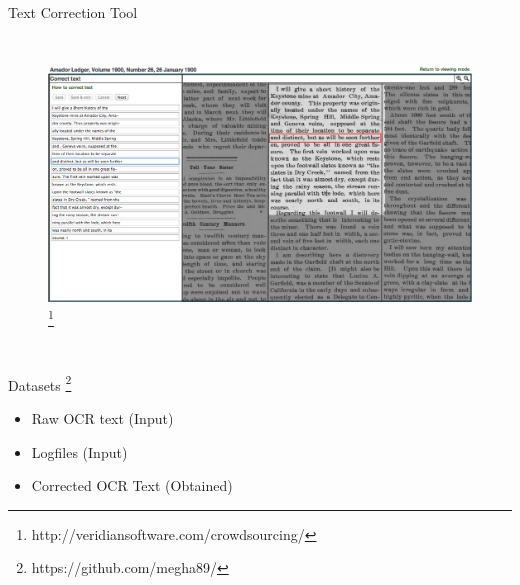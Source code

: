 \documentclass{beamer}
\begin{document}
\begin{frame}{Text Correction Tool}
\begin{columns}
\begin{figure}[ht]
\begin{center}
\includegraphics[height=2.5 in]{images/correction.jpg}
\footnote{http://veridiansoftware.com/crowdsourcing/}
\end{center}
\end{figure}
\end{columns}
\end{frame}


\begin{frame}{Datasets \footnote{https://github.com/megha89/}}
\begin{itemize}
\item Raw OCR text (Input)
\item Logfiles (Input)
\item Corrected OCR Text (Obtained)
\end{itemize}
\end{frame}

\end{document}
